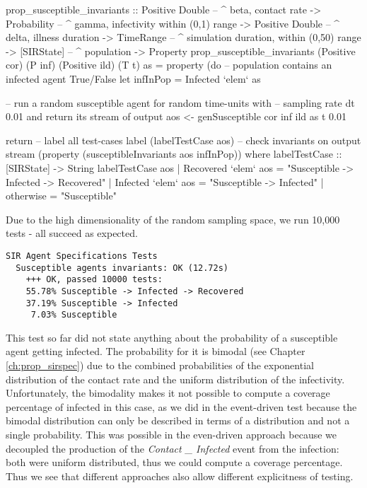 \begin{HaskellCode}
prop_susceptible_invariants :: Positive Double  -- ^ beta, contact rate
                            -> Probability      -- ^ gamma, infectivity within (0,1) range
                            -> Positive Double  -- ^ delta, illness duration
                            -> TimeRange        -- ^ simulation duration, within (0,50) range
                            -> [SIRState]       -- ^ population
                            -> Property
prop_susceptible_invariants
      (Positive cor) (P inf) (Positive ild) (T t) as = property (do  
    -- population contains an infected agent True/False
    let infInPop = Infected `elem` as

    -- run a random susceptible agent for random time-units with 
    -- sampling rate dt 0.01 and return its stream of output
    aos <- genSusceptible cor inf ild as t 0.01

    return 
        -- label all test-cases
        label (labelTestCase aos) 
        -- check invariants on output stream
        (property (susceptibleInvariants aos infInPop))
  where
    labelTestCase :: [SIRState] -> String
    labelTestCase aos
      | Recovered `elem` aos = "Susceptible -> Infected -> Recovered"
      | Infected `elem` aos  = "Susceptible -> Infected"
      | otherwise            = "Susceptible"
\end{HaskellCode}

Due to the high dimensionality of the random sampling space, we run 10,000 tests - all succeed as expected.

\begin{verbatim}
SIR Agent Specifications Tests
  Susceptible agents invariants: OK (12.72s)
    +++ OK, passed 10000 tests:
    55.78% Susceptible -> Infected -> Recovered
    37.19% Susceptible -> Infected
     7.03% Susceptible
\end{verbatim}

This test so far did not state anything about the probability of a susceptible agent getting infected. The probability for it is bimodal (see Chapter \ref{ch:prop_sirspec}) due to the combined probabilities of the exponential distribution of the contact rate and the uniform distribution of the infectivity. Unfortunately, the bimodality makes it not possible to compute a coverage percentage of infected in this case, as we did in the event-driven test because the bimodal distribution can only be described in terms of a distribution and not a single probability. This was possible in the even-driven approach because we decoupled the production of the \textit{Contact \_ Infected} event from the infection: both were uniform distributed, thus we could compute a coverage percentage. Thus we see that different approaches also allow different explicitness of testing.

